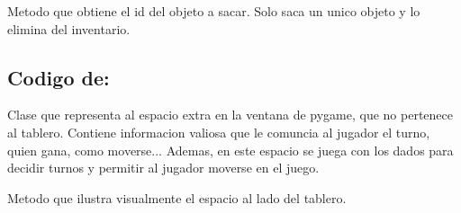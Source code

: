 \documentclass[letterpaper,10pt,english]{sphinxmanual}
\begin{document}
\begin{fulllineitems}
\begin{fulllineitems}
\end{fulllineitems}


\begin{fulllineitems}
\label{\detokenize{codigo:inventario.Inventario.sacar_objeto}}
Metodo que obtiene el id del objeto a sacar. Solo saca un unico objeto y lo elimina del inventario.

\end{fulllineitems}


\end{fulllineitems}



\subsection{Codigo de: }
\label{\detokenize{codigo:module-sidebar}}\label{\detokenize{codigo:codigo-de-sidebar}}

\begin{fulllineitems}
\label{\detokenize{codigo:sidebar.Sidebar}}
Clase que representa al espacio extra en la ventana de pygame, que no pertenece al tablero.
Contiene informacion valiosa que le comuncia al jugador el turno, quien gana, como moverse...
Ademas, en este espacio se juega con los dados para decidir turnos y permitir al jugador moverse
en el juego.

\begin{fulllineitems}
\label{\detokenize{codigo:sidebar.Sidebar.dibujar}}
Metodo que ilustra visualmente el espacio al lado del tablero.

\end{fulllineitems}


\end{fulllineitems}
\end{document}

